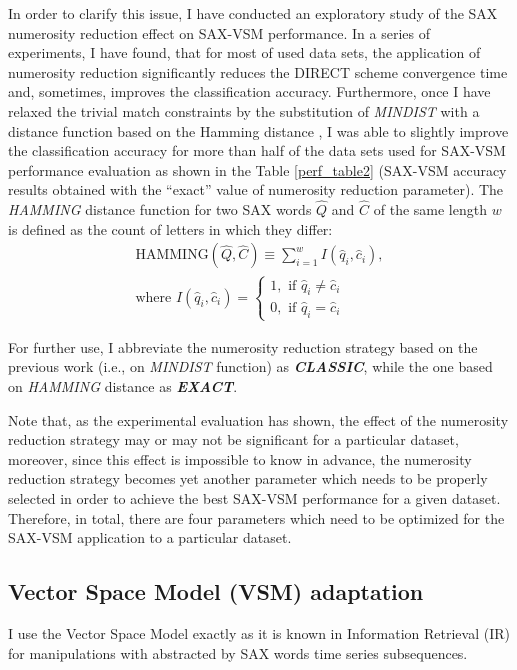 In order to clarify this issue, I have conducted an exploratory study of the SAX numerosity reduction 
effect on SAX-VSM performance. In a series of experiments, I have found, that for most of used data sets, the application of 
numerosity reduction significantly reduces the DIRECT scheme convergence time and, sometimes, improves the classification accuracy. 
Furthermore, once I have relaxed the trivial match constraints by the substitution of 
\textit{MINDIST} with a distance function based on the Hamming distance \cite{hamming}, 
I was able to slightly improve the classification accuracy for more than half of the data sets used for \mbox{SAX-VSM}
performance evaluation as shown in the Table \ref{perf_table2} (SAX-VSM accuracy results obtained with the ``exact'' 
value of numerosity reduction parameter). 
The \textit{HAMMING} distance function for two SAX words $\hat{Q}$ and $\hat{C}$ of the same length $w$ 
is defined as the count of letters in which they differ:
\begin{equation}
\label{eq:hamming}
\begin{split}
\text{HAMMING}(\widehat{Q},\widehat{C}) \equiv \sum_{i=1}^{w} I( \widehat{q}_{i}, \widehat{c}_{i} ), \\
\text{where } I( \widehat{q}_{i}, \widehat{c}_{i} ) = 
\begin{cases}
 1,\text{ if } \widehat{q}_{i} \neq \widehat{c}_{i} \\
 0,\text{ if } \widehat{q}_{i} = \widehat{c}_{i}
\end{cases}
\end{split}                                                      
\end{equation}

For further use, I abbreviate the numerosity reduction strategy based on the previous work (i.e., on \textit{MINDIST} 
function) as \textit{\textbf{CLASSIC}}, while the one based on \textit{HAMMING} distance as \textit{\textbf{EXACT}}.

Note that, as the experimental evaluation has shown, the effect of the numerosity reduction strategy may or may not be significant 
for a particular dataset, moreover, since this effect is impossible to know in advance, the numerosity reduction strategy becomes 
yet another parameter which needs to be properly selected in order to achieve the best SAX-VSM performance for a given dataset. 
Therefore, in total, there are four parameters which need to be optimized for the SAX-VSM application to a particular dataset.

\subsection{Vector Space Model (VSM) adaptation}\label{vsm}
I use the Vector Space Model exactly as it is known in Information Retrieval (IR) \cite{citeulike:300428} for 
manipulations with abstracted by SAX words time series subsequences. 

